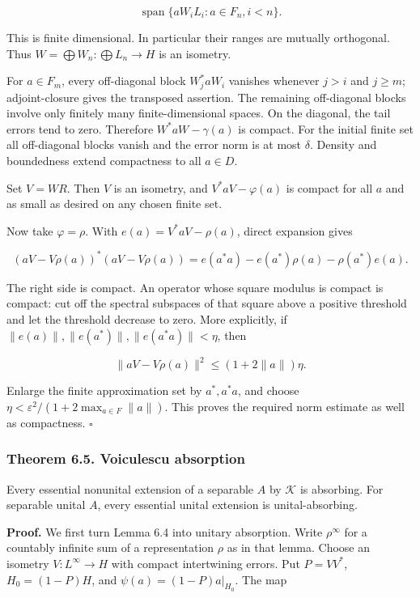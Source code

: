 \documentclass[
  11pt,
]{article}
\begin{document}
\[
\operatorname{span}\{aW_iL_i:a\in F_n, i<n\}.
\]

This is finite dimensional. In particular their ranges are mutually
orthogonal. Thus \(W=\bigoplus W_n:\bigoplus L_n\to H\) is an isometry.

For \(a\in F_m\), every off-diagonal block \(W_j^*aW_i\) vanishes
whenever \(j>i\) and \(j\geq m\); adjoint-closure gives the transposed
assertion. The remaining off-diagonal blocks involve only finitely many
finite-dimensional spaces. On the diagonal, the tail errors tend to
zero. Therefore \(W^*aW-\gamma(a)\) is compact. For the initial finite
set all off-diagonal blocks vanish and the error norm is at most
\(\delta\). Density and boundedness extend compactness to all
\(a\in D\).

Set \(V=WR\). Then \(V\) is an isometry, and \(V^*aV-\varphi(a)\) is
compact for all \(a\) and as small as desired on any chosen finite set.

Now take \(\varphi=\rho\). With \(e(a)=V^*aV-\rho(a)\), direct expansion
gives

\[
(aV-V\rho(a))^*(aV-V\rho(a))
=e(a^*a)-e(a^*)\rho(a)-\rho(a^*)e(a).
\]

The right side is compact. An operator whose square modulus is compact
is compact: cut off the spectral subspaces of that square above a
positive threshold and let the threshold decrease to zero. More
explicitly, if \(\|e(a)\|,\|e(a^*)\|,\|e(a^*a)\|<\eta\), then

\[
\|aV-V\rho(a)\|^2\leq(1+2\|a\|)\eta.
\]

Enlarge the finite approximation set by \(a^*,a^*a\), and choose
\(\eta<\varepsilon^2/(1+2\max_{a\in F}\|a\|)\). This proves the required
norm estimate as well as compactness. \(\square\)

\subsubsection{Theorem 6.5. Voiculescu
absorption}\label{theorem-6.5.-voiculescu-absorption}

Every essential nonunital extension of a separable \(A\) by
\(\mathcal K\) is absorbing. For separable unital \(A\), every essential
unital extension is unital-absorbing.

\textbf{Proof.} We first turn Lemma 6.4 into unitary absorption. Write
\(\rho^\infty\) for a countably infinite sum of a representation
\(\rho\) as in that lemma. Choose an isometry \(V:L^\infty\to H\) with
compact intertwining errors. Put \(P=VV^*\), \(H_0=(1-P)H\), and
\(\psi(a)=(1-P)a|_{H_0}\). The map
\end{document}
